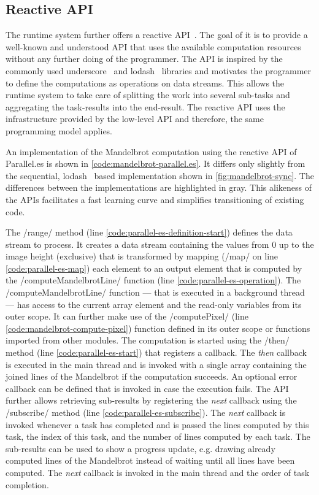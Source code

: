 \subsection{Reactive API}
The runtime system further offers a reactive API~\cite{Meijer2012}. The goal of it is to provide a well-known and understood API that uses the available computation resources without any further doing of the programmer. The API is inspired by the commonly used underscore~\cite{underscorejs} and lodash~\cite{lodash} libraries and motivates the programmer to define the computations as operations on data streams. This allows the runtime system to take care of splitting the work into several sub-tasks and aggregating the task-results into the end-result. The reactive API uses the infrastructure provided by the low-level API and therefore, the same programming model applies.


 An implementation of the Mandelbrot computation using the reactive API of Parallel.es is shown in \cref{code:mandelbrot-parallel.es}. It differs only slightly from the sequential, lodash~\cite{lodash} based implementation shown in \cref{fig:mandelbrot-sync}. The differences between the implementations are highlighted in gray. This alikeness of the APIs facilitates a fast learning curve and simplifies transitioning of existing code. 
 
 The \javascriptinline/range/ method (line \ref{code:parallel-es-definition-start}) defines the data stream to process. It creates a data stream containing the values from 0 up to the image height (exclusive) that is transformed by mapping (\javascriptinline/map/ on line \ref{code:parallel-es-map}) each element to an output element that is computed by the \javascriptinline/computeMandelbrotLine/ function (line \ref{code:parallel-es-operation}). The \javascriptinline/computeMandelbrotLine/ function --- that is executed in a background thread --- has access to the current array element and the read-only variables from its outer scope. It can further make use of the \javascriptinline/computePixel/ (line \ref{code:mandelbrot-compute-pixel}) function defined in its outer scope or functions imported from other modules. The computation is started using the \javascriptinline/then/ method (line \ref{code:parallel-es-start}) that registers a callback. The \textit{then} callback is executed in the main thread and is invoked with a single array containing the joined lines of the Mandelbrot if the computation succeeds. An optional error callback can be defined that is invoked in case the execution fails. The API further allows retrieving sub-results by registering the \textit{next} callback using the \javascriptinline/subscribe/ method (line \ref{code:parallel-es-subscribe}). The \textit{next} callback is invoked whenever a task has completed and is passed the lines computed by this task, the index of this task, and the number of lines computed by each task. The sub-results can be used to show a progress update, e.g. drawing already computed lines of the Mandelbrot instead of waiting until all lines have been computed. The \textit{next} callback is invoked in the main thread and the order of task completion. 
 
